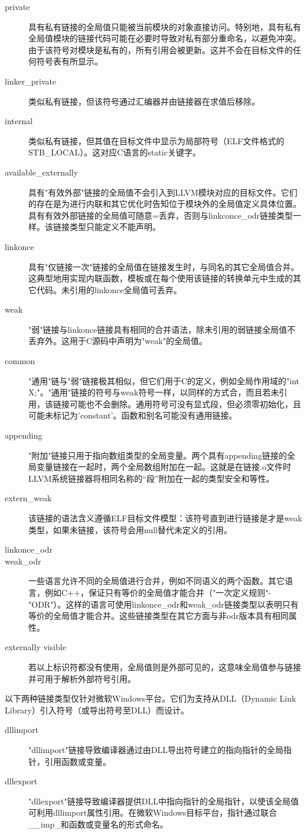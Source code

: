 \documentclass[12pt,a4paper]{article}
\begin{document}
\begin{description}
\item[private] 具有私有链接的全局值只能被当前模块的对象直接访问。特别地，具有私有全局值模块的链接代码可能在必要时导致对私有部分重命名，以避免冲突。由于该符号对模块是私有的，所有引用会被更新。这并不会在目标文件的任何符号表有所显示。
\item[linker\_private] 类似私有链接，但该符号通过汇编器并由链接器在求值后移除。
\item[internal] 类似私有链接，但其值在目标文件中显示为局部符号（ELF文件格式的STB\_LOCAL）。这对应C语言的static关键字。
\item[available\_externally] 具有"有效外部"链接的全局值不会引入到LLVM模块对应的目标文件。它们的存在是为进行内联和其它优化时告知位于模块外的全局值定义具体位置。具有有效外部链接的全局值可随意=丢弃，否则与linkconce\_odr链接类型一样。该链接类型只能定义不能声明。
\item[linkonce] 具有"仅链接一次"链接的全局值在链接发生时，与同名的其它全局值合并。这典型地用实现内联函数，模板或在每个使用该链接的转换单元中生成的其它代码。未引用的linkonce全局值可丢弃。
\item[weak] "弱"链接与linkonce链接具有相同的合并语法，除未引用的弱链接全局值不丢弃外。这用于C源码中声明为"weak"的全局值。
\item[common] "通用"链与"弱"链接极其相似，但它们用于C的定义，例如全局作用域的"int X;"。"通用"链接的符号与weak符号一样，以同样的方式合，而且若未引用，该链接可能也不会删除。通用符号可没有显式段，但必须零初始化，且可能未标记为'constant'。函数和别名可能没有通用链接。
\item[appending] "附加"链接只用于指向数组类型的全局变量。两个具有appending链接的全局变量链接在一起时，两个全局数组附加在一起。这就是在链接.o文件时LLVM系统链接器将相同名称的“段”附加在一起的类型安全和等性。
\item[extern\_weak] 该链接的语法含义遵循ELF目标文件模型：该符号直到进行链接是才是weak类型，如果未链接，该符号会用null替代未定义的引用。
\item[linkonce\_odr] 
\item[weak\_odr] 一些语言允许不同的全局值进行合并，例如不同语义的两个函数。其它语言，例如C++，保证只有等价的全局值才能合并（"一次定义规则"-"ODR"）。这样的语言可使用linkonce\_odr和weak\_odr链接类型以表明只有等价的全局值才能合并。这些链接类型在其它方面与非odr版本具有相同属性。
\item[externally visible] 若以上标识符都没有使用，全局值则是外部可见的，这意味全局值参与链接并可用于解析外部符号引用。
\end{description}
以下两种链接类型仅针对微软Windows平台。它们为支持从DLL（Dynamic Link Library）引入符号（或导出符号至DLL）而设计。
\begin{description}
\item[dllimport] "dllimport"链接导致编译器通过由DLL导出符号建立的指向指针的全局指针，引用函数或变量。
\item[dllexport] "dllexport"链接导致编译器提供DLL中指向指针的全局指针，以使该全局值可利用dllimport属性引用。在微软Windows目标平台，指针通过联合\_\_imp\_和函数或变量名的形式命名。
\end{description}
\end{document}
